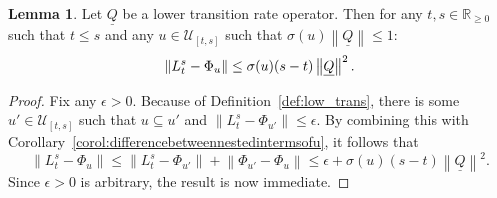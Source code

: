 \documentclass[10pt,a4paper]{paper}
\theoremstyle{definition}
\newtheorem{lemma}[theorem]{Lemma}
\newcommand{\reals}{\mathbb{R}}
\newcommand{\realsnonneg}{\reals_{\geq 0}}
\newcommand{\lrate}{\underline{Q}}
\newcommand{\norm}[1]{\left\lVert #1 \right\rVert}
\begin{document}
\begin{lemma}\label{lemma:limitboundonL}
Let $\lrate$ be a lower transition rate operator. Then for any $t,s\in\realsnonneg$ such that $t\leq s$ and any $u\in\mathcal{U}_{[t,s]}$ such that $\sigma(u)\norm{\lrate}\leq 1$:
\begin{equation*}
\norm{L_t^s-\Phi_{u}}\leq\sigma(u)(s-t)\norm{\lrate}^2.\vspace{5pt}
\end{equation*}
\end{lemma}
\begin{proof}
Fix any $\epsilon>0$. Because of Definition~\ref{def:low_trans}, there is some $u'\in\mathcal{U}_{[t,s]}$ such that $u\subseteq u'$ and $\norm{L_t^s-\Phi_{u'}}\leq\epsilon$. By combining this with Corollary~\ref{corol:differencebetweennestedintermsofu}, it follows that
\begin{equation*}
\norm{L_t^s-\Phi_{u}}
\leq
\norm{L_t^s-\Phi_{u'}}
+
\norm{\Phi_{u'}-\Phi_{u}}
\leq\epsilon+
\sigma(u)(s-t)\norm{\lrate}^2.
\end{equation*}
Since $\epsilon>0$ is arbitrary, the result is now immediate.
\end{proof}
\end{document}
